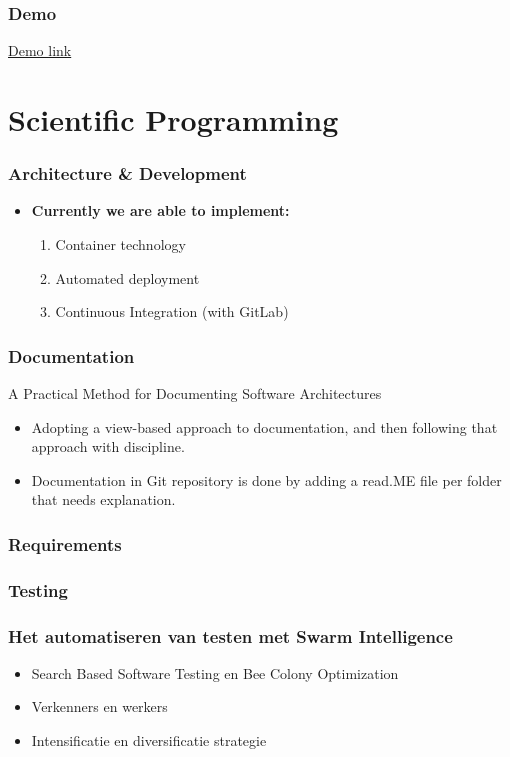 \documentclass[12pt]{beamer}
\begin{document}
    \begin{frame}
        \frametitle{Demo}
        \href{http://dev-jiskefet.westeurope.cloudapp.azure.com/}{Demo link}
    \end{frame}

    \section{Scientific Programming}
    \begin{frame}
        \frametitle{Architecture \& Development}
        \begin{itemize}
            \item<1->\textbf{Currently we are able to implement:}
            \begin{enumerate}    
                \item<2-> Container technology
                \item<3-> Automated deployment
                \item<4-> Continuous Integration (with GitLab)
            \end{enumerate}
        \end{itemize}
    \end{frame}

    \begin{frame}
        \frametitle{Documentation}
        A Practical Method for Documenting Software Architectures
    \begin{itemize}
        \item Adopting a view-based approach to documentation,
        and then following that approach with discipline.
        \item Documentation in Git repository is done by adding a read.ME file
        per folder that needs explanation.
    \end{itemize}
    \end{frame}

    \begin{frame}
        \frametitle{Requirements}
    \end{frame}

    \begin{frame}
        \frametitle{Testing}
    \end{frame}

    \begin{frame}
        \frametitle{Het automatiseren van testen met Swarm Intelligence}
        \begin{itemize}
            \item Search Based Software Testing en Bee Colony Optimization
            \item Verkenners en werkers
            \item Intensificatie en diversificatie strategie
        \end{itemize}
    \end{frame}
\end{document}
